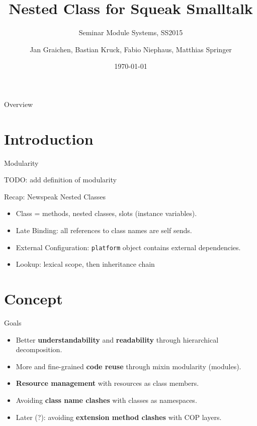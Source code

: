\documentclass[xcolor=dvipsname, handout]{beamer} %
\title{Nested Class for Squeak Smalltalk}
\subtitle{Seminar Module Systems, SS2015}
\author{Jan Graichen, Bastian Kruck, Fabio Niephaus, Matthias Springer}
\date{\today}
\institute[2012]{Hasso Plattner Institute, Software Architecture Group}
\begin{document}
\begin{frame}[plain]
	\maketitle
\end{frame}
\begin{frame}{Overview}
	\tableofcontents[hideallsubsections]
\end{frame}


\section{Introduction}

\begin{frame}{Modularity}
\begin{table}
TODO: add definition of modularity
\end{table}
\end{frame}

\begin{frame}{Recap: Newspeak Nested Classes}
  \begin{itemize}
    \item Class = methods, nested classes, slots (instance variables).
    \item Late Binding: all references to class names are self sends.
    \item External Configuration: \texttt{platform} object contains external dependencies.
    \item Lookup: lexical scope, then inheritance chain
  \end{itemize}
\end{frame}

\section{Concept}
\begin{frame}{Goals}
  \begin{itemize}
    \item Better \textbf{understandability} and \textbf{readability} through hierarchical decomposition.
    \item More and fine-grained \textbf{code reuse} through mixin modularity (modules).
    \item \textbf{Resource management} with resources as class members.
    \item Avoiding \textbf{class name clashes} with classes as namespaces.
    \item Later (?): avoiding \textbf{extension method clashes} with COP layers.
  \end{itemize}
\end{frame}
\end{document}
